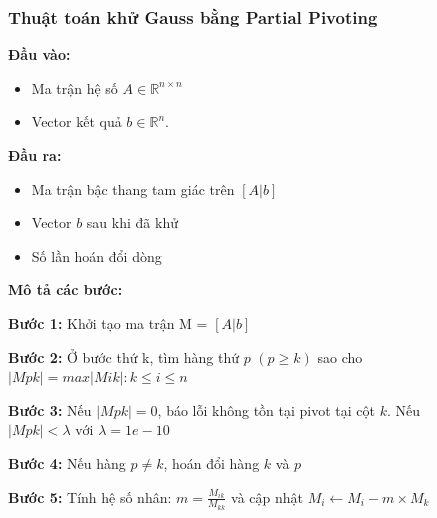 \documentclass[a4paper]{article}
\begin{document}
\subsubsection{Thuật toán khử Gauss bằng Partial Pivoting}

\textbf{Đầu vào: }

\begin{itemize}
    \item Ma trận hệ số $A \in \mathbb{R}^{n \times n}$
    \item Vector kết quả $b \in \mathbb{R}^n$.
\end{itemize}

\textbf{Đầu ra: }

\begin{itemize}
    \item Ma trận bậc thang tam giác trên $[A|b]$
    \item Vector $b$ sau khi đã khử
    \item Số lần hoán đổi dòng
\end{itemize}

\textbf{Mô tả các bước: }

\textbf{Bước 1: } Khởi tạo ma trận M = $[A|b]$

\textbf{Bước 2: } Ở bước thứ k, tìm hàng thứ $p$ $(p \ge k)$ sao cho $|Mpk| = max{|Mik| : k \le i \le n}$

\textbf{Bước 3: } Nếu $|Mpk| = 0$, báo lỗi không tồn tại pivot tại cột $k$. Nếu $|Mpk| < \lambda \text{ với } \lambda = 1e - 10$ 

\textbf{Bước 4: } Nếu hàng $p \ne k$, hoán đổi hàng $k$ và $p$

\textbf{Bước 5: } Tính hệ số nhân: $m = \frac{M_{ik}}{M_{kk}}$ và cập nhật $M_i \gets M_i - m \times M_k$
\end{document}
